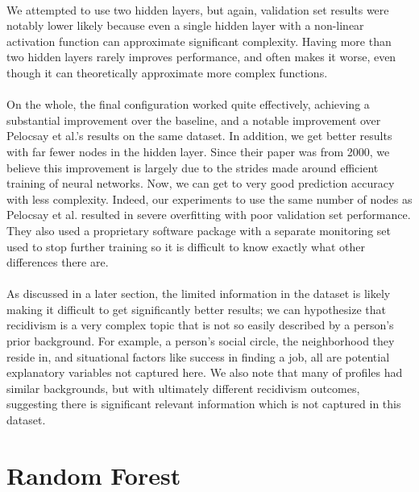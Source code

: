 \documentclass[a4paper]{article}
\theoremstyle{plain}
\begin{document}
\paragraph{}
We attempted to use two hidden layers, but again, validation set results were notably lower likely because even a single hidden layer with a non-linear activation function can approximate significant complexity. Having more than two hidden layers rarely improves performance, and often makes it worse, even though it can theoretically approximate more complex functions. \cite{bengio2007scaling}

\paragraph{}
On the whole, the final configuration worked quite effectively, achieving a substantial improvement over the baseline, and a notable improvement over Pelocsay et al.'s results on the same dataset. In addition, we get better results with far fewer nodes in the hidden layer. Since their paper was from 2000, we believe this improvement is largely due to the strides made around efficient training of neural networks. Now, we can get to very good prediction accuracy with less complexity. Indeed, our experiments to use the same number of nodes as Pelocsay et al. resulted in severe overfitting with poor validation set performance. They also used a proprietary software package with a separate monitoring set used to stop further training so it is difficult to know exactly what other differences there are.

\paragraph{}
As discussed in a later section, the limited information in the dataset is likely making it difficult to get significantly better results; we can hypothesize that recidivism is a very complex topic that is not so easily described by a person's prior background. For example, a person's social circle, the neighborhood they reside in, and situational factors like success in finding a job, all are potential explanatory variables not captured here.\cite{tillyer2011social} We also note that many of profiles had similar backgrounds, but with ultimately different recidivism outcomes, suggesting there is significant relevant information which is not captured in this dataset.

\section{Random Forest}
\end{document}
